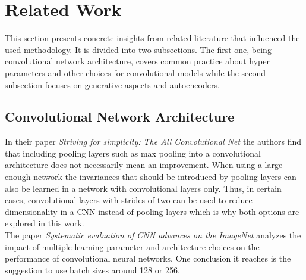 \section{Related Work}

This section presents concrete insights from related literature that influenced the used methodology. It is 
divided into two subsections. The first one, being convolutional network architecture, covers common practice about
hyper parameters and other choices for convolutional models while the second subsection focuses on generative aspects
and autoencoders.

\subsection{Convolutional Network Architecture}

In their paper \textit{Striving for simplicity: The All Convolutional Net} \parencite{2015-springenberg-striving}
the authors find that including pooling layers such as max pooling into a convolutional architecture does not 
necessarily mean an improvement. When using a large enough network the invariances that should be
introduced by pooling layers can also be learned in a network with convolutional layers only. Thus, in certain cases,
convolutional layers with strides of two can be used to reduce dimensionality in a CNN instead of pooling layers
which is why both options are explored in this work.\\

The paper \textit{Systematic evaluation of CNN advances on the ImageNet} \parencite{2016-mishkin-systematic} analyzes
the impact of multiple learning parameter and architecture choices on the performance of convolutional neural networks.
One conclusion it reaches is the suggestion to use batch sizes around 128 or 256. 